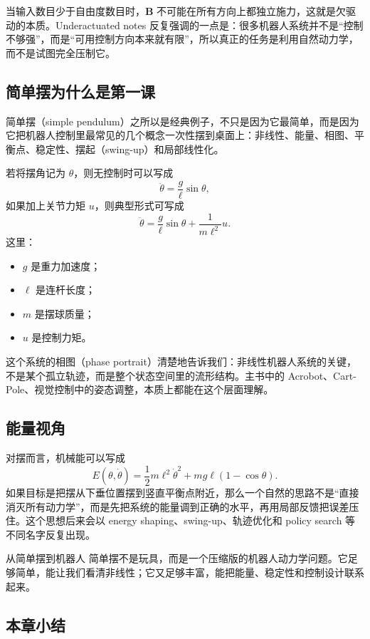 \documentclass[a4paper]{article}
\newcommand{\bB}{\mathbf{B}}
\begin{document}
当输入数目少于自由度数目时，$\bB$ 不可能在所有方向上都独立施力，这就是欠驱动的本质。Underactuated notes 反复强调的一点是：很多机器人系统并不是“控制不够强”，而是“可用控制方向本来就有限”，所以真正的任务是利用自然动力学，而不是试图完全压制它。

\subsection{简单摆为什么是第一课}

简单摆（simple pendulum）之所以是经典例子，不只是因为它最简单，而是因为它把机器人控制里最常见的几个概念一次性摆到桌面上：非线性、能量、相图、平衡点、稳定性、摆起（swing-up）和局部线性化。

若将摆角记为 $\theta$，则无控制时可以写成
\[
\ddot{\theta} = \frac{g}{\ell}\sin\theta,
\]
如果加上关节力矩 $u$，则典型形式可写成
\[
\ddot{\theta} = \frac{g}{\ell}\sin\theta + \frac{1}{m\ell^2}u.
\]
这里：
\begin{itemize}
  \item $g$ 是重力加速度；
  \item $\ell$ 是连杆长度；
  \item $m$ 是摆球质量；
  \item $u$ 是控制力矩。
\end{itemize}

这个系统的相图（phase portrait）清楚地告诉我们：非线性机器人系统的关键，不是某个孤立轨迹，而是整个状态空间里的流形结构。主书中的 Acrobot、Cart-Pole、视觉控制中的姿态调整，本质上都能在这个层面理解。

\subsection{能量视角}

对摆而言，机械能可以写成
\[
E(\theta,\dot{\theta}) = \frac{1}{2}m\ell^2\dot{\theta}^2 + mg\ell(1-\cos\theta).
\]
如果目标是把摆从下垂位置摆到竖直平衡点附近，那么一个自然的思路不是“直接消灭所有动力学”，而是先把系统的能量调到正确的水平，再用局部反馈把误差压住。这个思想后来会以 energy shaping、swing-up、轨迹优化和 policy search 等不同名字反复出现。

\begin{knowledgebox}{从简单摆到机器人}
简单摆不是玩具，而是一个压缩版的机器人动力学问题。它足够简单，能让我们看清非线性；它又足够丰富，能把能量、稳定性和控制设计联系起来。
\end{knowledgebox}

\subsection{本章小结}
\end{document}
